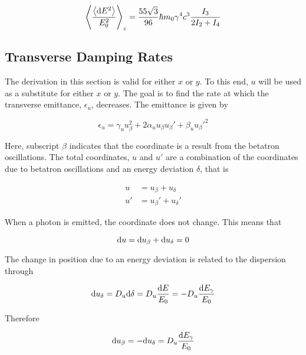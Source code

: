\begin{equation}
    \left\langle {\frac{\left\langle {\text{d}E^2} \right\rangle}{E_0^2}} \right\rangle_z = \frac{55 \sqrt{3}}{96} \hbar m_0 \gamma^4 c^3 \frac{I_3}{2I_2 + I_4}
\end{equation}

\subsection{Transverse Damping Rates}
\label{sec:transversedamping}

The derivation in this section is valid for either $x$ or $y$. To this end, $u$ will be used as a substitute for either $x$ or $y$. The goal is to find the rate at which the transverse emittance, $\epsilon_u$, decreases. The emittance is given by

\begin{equation}
    \epsilon_u = \gamma_u u_\beta^2 + 2 \alpha_u u_\beta u_\beta' + \beta_u u_\beta'^2
    \label{eq:emittanceu}
\end{equation}

Here, subscript $\beta$ indicates that the coordinate is a result from the betatron oscillations. The total coordinates, $u$ and $u'$ are a combination of the coordinates due to betatron oscillations and an energy deviation $\delta$, that is

\begin{align}
    u  &= u_\beta  + u_\delta\\
    u' &= u_\beta' + u_\delta'
\end{align}

When a photon is emitted, the coordinate does not change. This means that

\begin{equation}
    \text{d} u = \text{d} u_\beta + \text{d} u_\delta = 0
\end{equation}

The change in position due to an energy deviation is related to the dispersion through

\begin{equation}
    \text{d} u_\delta = D_u \text{d} \delta = D_u \frac{\text{d} E}{E_0} = - D_u \frac{\text{d} E_\gamma}{E_0}
\end{equation}

Therefore

\begin{equation}
    \text{d} u_\beta = - \text{d} u_\delta = D_u \frac{\text{d} E_\gamma}{E_0}
    \label{eq:deeubeta}
\end{equation}


